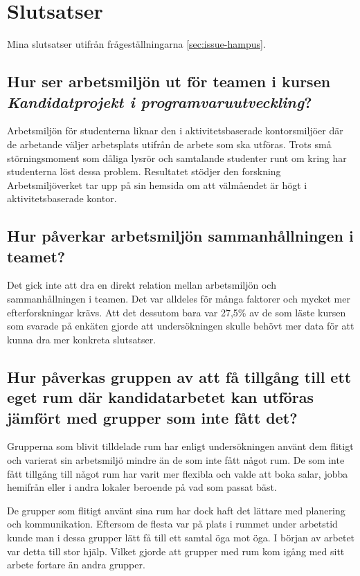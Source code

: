 \section{Slutsatser}
\label{sec:conclusions-hampus}

Mina slutsatser utifrån frågeställningarna \ref{sec:issue-hampus}.

\subsection{Hur ser arbetsmiljön ut för teamen i kursen \textit{Kandidatprojekt i programvaruutveckling}?}
Arbetsmiljön för studenterna liknar den i aktivitetsbaserade kontorsmiljöer där de arbetande väljer arbetsplats utifrån de arbete som ska utföras. Trots små störningsmoment som dåliga lysrör och samtalande studenter runt om kring har studenterna löst dessa problem. Resultatet stödjer den forskning Arbetsmiljöverket tar upp på sin hemsida om att välmåendet är högt i aktivitetsbaserade kontor.  

\subsection{Hur påverkar arbetsmiljön sammanhållningen i teamet?}
Det gick inte att dra en direkt relation mellan arbetsmiljön och sammanhållningen i teamen. Det var alldeles för många faktorer och mycket mer efterforskningar krävs. Att det dessutom bara var 27,5\% av de som läste kursen som svarade på enkäten gjorde att undersökningen skulle behövt mer data för att kunna dra mer konkreta slutsatser.

\subsection{Hur påverkas gruppen av att få tillgång till ett eget rum där kandidatarbetet kan utföras jämfört med grupper som inte fått det?}
Grupperna som blivit tilldelade rum har enligt undersökningen använt dem flitigt och varierat sin arbetsmiljö mindre än de som inte fått något rum. De som inte fått tillgång till något rum har varit mer flexibla och valde att boka salar, jobba hemifrån eller i andra lokaler beroende på vad som passat bäst. 

De grupper som flitigt använt sina rum har dock haft det lättare med planering och kommunikation. Eftersom de flesta var på plats i rummet under arbetstid kunde man i dessa grupper lätt få till ett samtal öga mot öga. I början av arbetet var detta till stor hjälp. Vilket gjorde att grupper med rum kom igång med sitt arbete fortare än andra grupper.


